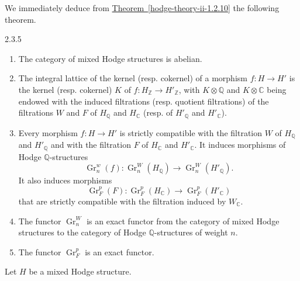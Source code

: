     We immediately deduce from \hyperref[hodge-theory-ii-1.2.10]{Theorem~\ref*{hodge-theory-ii-1.2.10}} the following theorem.\begin{theorem}{2.3.5}\label{hodge-theory-ii-2.3.5}\skipsinglepar\begin{enumerate}
    
 \item[(i)]
      The category of mixed Hodge structures is abelian.
    


    
 \item[(ii)]
      The integral lattice of the kernel (resp. cokernel) of a morphism \(f\colon  H\to  H'\) is the kernel (resp. cokernel) \(K\) of \(f\colon  H_\mathbb {Z}\to  H'_\mathbb {Z}\), with \(K\otimes \mathbb {Q}\) and \(K\otimes \mathbb {C}\) being endowed with the induced filtrations (resp. quotient filtrations) of the filtrations \(W\) and \(F\) of \(H_\mathbb {Q}\) and \(H_\mathbb {C}\) (resp. of \(H'_\mathbb {Q}\) and \(H'_\mathbb {C}\)).
    


    
 \item[(iii)]
      Every morphism \(f\colon  H\to  H'\) is strictly compatible with the filtration \(W\) of \(H_\mathbb {Q}\) and \(H'_\mathbb {Q}\) and with the filtration \(F\) of \(H_\mathbb {C}\) and \(H'_\mathbb {C}\).
      It induces morphisms of Hodge \(\mathbb {Q}\)-structures
      \[         \operatorname {Gr}_n^w(f)\colon          \operatorname {Gr}_n^W(H_\mathbb {Q})         \to  \operatorname {Gr}_n^W(H'_\mathbb {Q}).       \]
      It also induces morphisms
      \[         \operatorname {Gr}_F^p(F)\colon          \operatorname {Gr}_F^p(H_\mathbb {C})         \to  \operatorname {Gr}_F^p(H'_\mathbb {C})       \]
      that are strictly compatible with the filtration induced by \(W_\mathbb {C}\).
    


    
 \item[(iv)]
      The functor \(\operatorname {Gr}_n^W\) is an exact functor from the category of mixed Hodge structures to the category of Hodge \(\mathbb {Q}\)-structures of weight \(n\).
    


    
 \item[(v)]
      The functor \(\operatorname {Gr}_F^p\) is an exact functor.
    

  \end{enumerate}\end{theorem}\label{hodge-theory-ii-2.3.6}\par{}Let \(H\) be a mixed Hodge structure.

